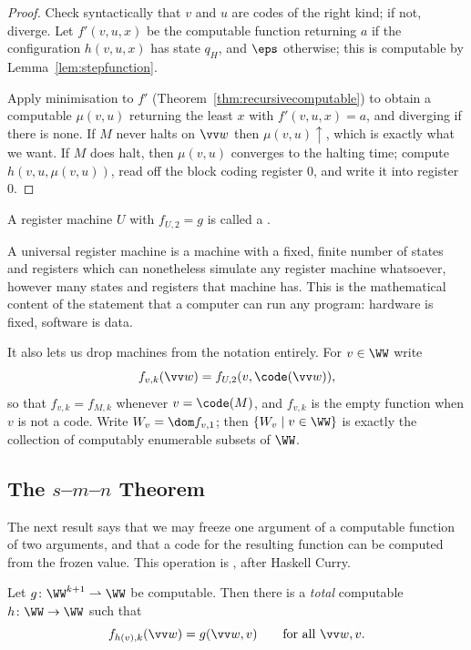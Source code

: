 \begin{proof}
	Check syntactically that $v$ and $u$ are codes of the right kind; if not, diverge. Let $f'(v,u,x)$ be the computable function returning $a$ if the configuration $h(v,u,x)$ has state $q_H$, and $\eps$ otherwise; this is computable by Lemma~\ref{lem:stepfunction}.

	Apply minimisation to $f'$ (Theorem~\ref{thm:recursivecomputable}) to obtain a computable $\mu(v,u)$ returning the least $x$ with $f'(v,u,x) = a$, and diverging if there is none. If $M$ never halts on $\vv w$ then $\mu(v,u)\uparrow$, which is exactly what we want. If $M$ does halt, then $\mu(v,u)$ converges to the halting time; compute $h(v,u,\mu(v,u))$, read off the block coding register $0$, and write it into register $0$.
\end{proof}

\begin{definition}
	A register machine $U$ with $f_{U,2} = g$ is called a .
\end{definition}

A universal register machine is a machine with a fixed, finite number of states and registers which can nonetheless simulate any register machine whatsoever, however many states and registers that machine has. This is the mathematical content of the statement that a computer can run any program: hardware is fixed, software is data.

It also lets us drop machines from the notation entirely. For $v \in \WW$ write
$$f_{v,k}(\vv w) = f_{U,2}(v, \code(\vv w)),$$
so that $f_{v,k} = f_{M,k}$ whenever $v = \code(M)$, and $f_{v,k}$ is the empty function when $v$ is not a code. Write $W_v = \dom f_{v,1}$; then $\{W_v \mid v \in \WW\}$ is exactly the collection of computably enumerable subsets of $\WW$.

\subsection{The \texorpdfstring{$s$--$m$--$n$}{s-m-n} Theorem}

The next result says that we may freeze one argument of a computable function of two arguments, and that a code for the resulting function can be computed from the frozen value. This operation is , after Haskell Curry.

\begin{theorem}\label{thm:smn}
	Let $g \colon \WW^{k+1} \rightharpoonup \WW$ be computable. Then there is a \emph{total} computable $h \colon \WW \to \WW$ such that
	$$f_{h(v),k}(\vv w) = g(\vv w, v) \qquad \text{for all } \vv w, v.$$
\end{theorem}

